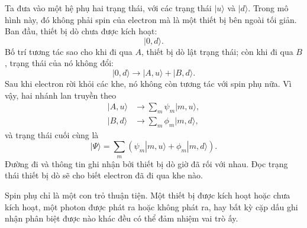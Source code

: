 Ta đưa vào một hệ phụ hai trạng thái, với các trạng thái \(|u\rangle\) và \(|d\rangle\). Trong mô hình này, đó không phải spin của electron mà là một thiết bị bên ngoài tối giản. Ban đầu, thiết bị dò chưa được kích hoạt:
\begin{equation}
|0,d\rangle.
\end{equation}
Bố trí tương tác sao cho khi đi qua \(A\), thiết bị dò lật trạng thái; còn khi đi qua \(B\), trạng thái của nó không đổi:
\begin{equation}
|0,d\rangle
\longrightarrow
|A,u\rangle+|B,d\rangle.
\end{equation}
Sau khi electron rời khỏi các khe, nó không còn tương tác với spin phụ nữa. Vì vậy, hai nhánh lan truyền theo
\begin{align}
|A,u\rangle &\longrightarrow \sum_m\psi_m|m,u\rangle, \\
|B,d\rangle &\longrightarrow \sum_m\phi_m|m,d\rangle,
\end{align}
và trạng thái cuối cùng là
\begin{equation}
|\Psi\rangle
=\sum_m\left(\psi_m|m,u\rangle+\phi_m|m,d\rangle\right).
\end{equation}
Đường đi và thông tin ghi nhận bởi thiết bị dò giờ đã rối với nhau. Đọc trạng thái thiết bị dò sẽ cho biết electron đã đi qua khe nào.

\begin{classroomqa}
\end{classroomqa}

Spin phụ chỉ là một con trỏ thuận tiện. Một thiết bị được kích hoạt hoặc chưa kích hoạt, một photon được phát ra hoặc không phát ra, hay bất kỳ cặp dấu ghi nhận phân biệt được nào khác đều có thể đảm nhiệm vai trò ấy.

\begin{classroomqa}
\end{classroomqa}

